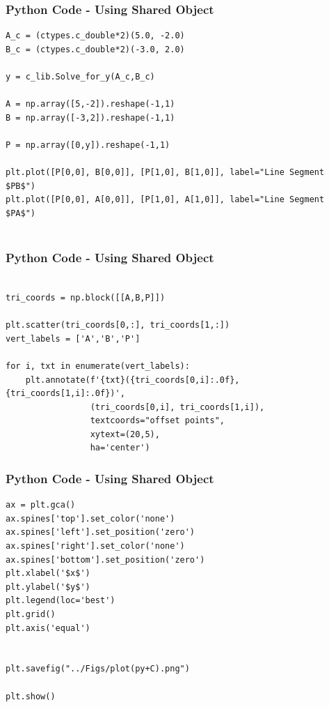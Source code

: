 \documentclass{beamer}
\begin{document}
\begin{frame}[fragile]
    \frametitle{Python Code - Using Shared Object}
    \begin{lstlisting}
A_c = (ctypes.c_double*2)(5.0, -2.0) 
B_c = (ctypes.c_double*2)(-3.0, 2.0)

y = c_lib.Solve_for_y(A_c,B_c)

A = np.array([5,-2]).reshape(-1,1) 
B = np.array([-3,2]).reshape(-1,1)

P = np.array([0,y]).reshape(-1,1)

plt.plot([P[0,0], B[0,0]], [P[1,0], B[1,0]], label="Line Segment $PB$")
plt.plot([P[0,0], A[0,0]], [P[1,0], A[1,0]], label="Line Segment $PA$")


\end{lstlisting}
\end{frame}

\begin{frame}[fragile]
    \frametitle{Python Code - Using Shared Object}
    \begin{lstlisting}
    
tri_coords = np.block([[A,B,P]]) 

plt.scatter(tri_coords[0,:], tri_coords[1,:]) 
vert_labels = ['A','B','P'] 

for i, txt in enumerate(vert_labels):
    plt.annotate(f'{txt}({tri_coords[0,i]:.0f}, {tri_coords[1,i]:.0f})',
                 (tri_coords[0,i], tri_coords[1,i]), 
                 textcoords="offset points", 
                 xytext=(20,5), 
                 ha='center') 

\end{lstlisting}
\end{frame}



\begin{frame}[fragile]
    \frametitle{Python Code - Using Shared Object}
    \begin{lstlisting}
ax = plt.gca()
ax.spines['top'].set_color('none')
ax.spines['left'].set_position('zero')
ax.spines['right'].set_color('none')
ax.spines['bottom'].set_position('zero')
plt.xlabel('$x$')
plt.ylabel('$y$')
plt.legend(loc='best')
plt.grid() 
plt.axis('equal')


plt.savefig("../Figs/plot(py+C).png")

plt.show()

\end{lstlisting}
\end{frame}
\end{document}
